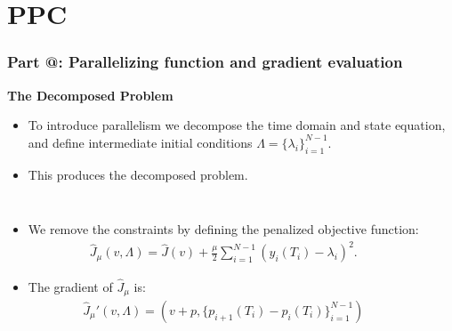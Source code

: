 \documentclass[9pt]{beamer}
\makeatletter
\newcommand*{\rom}[1]{\expandafter\@slowromancap\romannumeral #1@}
\makeatother
\begin{document}
\section{PPC}
\begin{frame}
\frametitle{\textbf{ Part \rom{4}:} Parallelizing function and gradient evaluation}
\textbf{The Decomposed Problem}
\begin{itemize}
\item{To introduce parallelism we decompose the time domain and state equation, and define intermediate initial conditions $\Lambda=\{\lambda_i\}_{i=1}^{N-1}$.}
\item{This produces the decomposed problem.}
\end{itemize}
\begin{columns}
\begin{itemize}
\item<2->{We remove the constraints by defining the penalized objective function:{\small
\begin{align*}
\hat{J}_{\mu}(v,\Lambda) = \hat{J}(v) + \frac{\mu}{2}\sum_{i=1}^{N-1}(y_{i}(T_i)-\lambda_i)^2.
\end{align*}}}
\item<3->{The gradient of $\hat{J}_{\mu}$ is:{\small
\begin{align*}
\hat J_{\mu}'(v,\Lambda) = (v+p,\{p_{i+1}(T_i)-p_{i}(T_i)\}_{i=1}^{N-1})
\end{align*}}}
\end{itemize}
\end{columns}
\end{frame}
\end{document}
